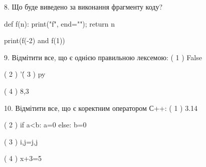 \documentclass[11pt]{article}
\begin{document}
8. Що буде виведено за виконання фрагменту коду?

def f(n):
    print("f", end="");
    return n

print(f(-2) and f(1))
\vspace{5mm}

9. %
Відмітити все, що є однією правильною лексемою:
( 1 ) False

( 2 ) '\'

( 3 ) py

( 4 ) 8,3
\vspace{5mm}

10. %
Відмітити все, що є коректним оператором С++:
( 1 ) 3.14%

( 2 ) if a<b: a=0 else: b=0

( 3 ) i,j=j,j

( 4 ) x+3=5
\vspace{5mm}

\newpage
\end{document}
